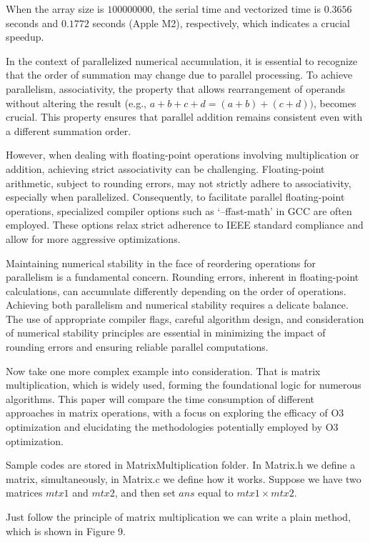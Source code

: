 \documentclass[conference]{IEEEtran}
\begin{document}
When the array size is $100000000$, the serial time and vectorized time is $0.3656$ seconds and $0.1772$ seconds (Apple M2), respectively, which indicates a crucial speedup.

In the context of parallelized numerical accumulation, it is essential to recognize that the order of summation may change due to parallel processing. To achieve parallelism, associativity, the property that allows rearrangement of operands without altering the result (e.g., $a+b+c+d=(a+b)+(c+d))$, becomes crucial. This property ensures that parallel addition remains consistent even with a different summation order.

However, when dealing with floating-point operations involving multiplication or addition, achieving strict associativity can be challenging. Floating-point arithmetic, subject to rounding errors, may not strictly adhere to associativity, especially when parallelized. Consequently, to facilitate parallel floating-point operations, specialized compiler options such as `--ffast-math' in GCC are often employed. These options relax strict adherence to IEEE standard compliance and allow for more aggressive optimizations.

Maintaining numerical stability in the face of reordering operations for parallelism is a fundamental concern. Rounding errors, inherent in floating-point calculations, can accumulate differently depending on the order of operations. Achieving both parallelism and numerical stability requires a delicate balance. The use of appropriate compiler flags, careful algorithm design, and consideration of numerical stability principles are essential in minimizing the impact of rounding errors and ensuring reliable parallel computations.

Now take one more complex example into consideration. That is matrix multiplication, which is widely used, forming the foundational logic for numerous algorithms. This paper will compare the time consumption of different approaches in matrix operations, with a focus on exploring the efficacy of O3 optimization and elucidating the methodologies potentially employed by O3 optimization.

Sample codes are stored in MatrixMultiplication folder. In Matrix.h we define a matrix, simultaneously, in Matrix.c we define how it works. Suppose we have two matrices $mtx1$ and $mtx2$, and then set $ans$ equal to $mtx1 \times mtx2$.

Just follow the principle of matrix multiplication we can write a plain method, which is shown in Figure 9.
\end{document}
